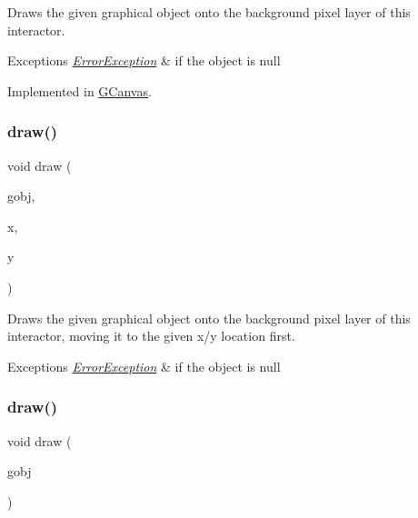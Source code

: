 Draws the given graphical object onto the background pixel layer of this interactor. 


\begin{DoxyExceptions}{Exceptions}
{\em \mbox{\hyperlink{classErrorException}{Error\+Exception}}} & if the object is null \\
\hline
\end{DoxyExceptions}


Implemented in \mbox{\hyperlink{classGCanvas_a00bf9d87527d59e6f11756589c25e4e7}{G\+Canvas}}.

\mbox{\label{classGDrawingSurface_acc3825d7a24815d1e2f78e7c3ffea6cc}} 
\subsubsection{\texorpdfstring{draw()}{draw()}\hspace{0.1cm}{\footnotesize\ttfamily [2/4]}}
{\footnotesize\ttfamily void draw (\begin{DoxyParamCaption}\item[{\mbox{\hyperlink{classGObject}{G\+Object}} $\ast$}]{gobj,  }\item[{double}]{x,  }\item[{double}]{y }\end{DoxyParamCaption})\hspace{0.3cm}{\ttfamily [virtual]}}



Draws the given graphical object onto the background pixel layer of this interactor, moving it to the given x/y location first. 


\begin{DoxyExceptions}{Exceptions}
{\em \mbox{\hyperlink{classErrorException}{Error\+Exception}}} & if the object is null \\
\hline
\end{DoxyExceptions}
\mbox{\label{classGDrawingSurface_a022a8d51c7fabcd79a0c809233e93453}} 
\subsubsection{\texorpdfstring{draw()}{draw()}\hspace{0.1cm}{\footnotesize\ttfamily [3/4]}}
{\footnotesize\ttfamily void draw (\begin{DoxyParamCaption}\item[{\mbox{\hyperlink{classGObject}{G\+Object}} \&}]{gobj }\end{DoxyParamCaption})\hspace{0.3cm}{\ttfamily [virtual]}}



